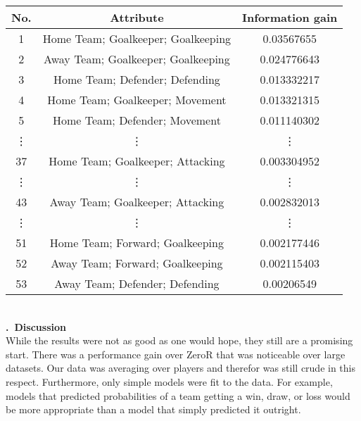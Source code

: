 \documentclass[a4paper,11pt,table]{article}
\renewcommand{\section}[1]{\stepcounter{section}\noindent\textbf{\arabic{section}.~#1}\\}
\begin{document}
\begin{center}
    \begin{tabular}{|c|c|c|}
        \hline
        No. &   Attribute                           &   Information gain \\
        \hline
        1   &   Home Team; Goalkeeper; Goalkeeping  &   0.03567655 \\
        \hline
        2   &   Away Team; Goalkeeper; Goalkeeping  &   0.024776643 \\
        \hline
        3   &   Home Team; Defender; Defending      &   0.013332217 \\
        \hline
        4   &   Home Team; Goalkeeper; Movement     &   0.013321315 \\
        \hline
        5   &   Home Team; Defender; Movement       &   0.011140302 \\
        \hline
        \vdots  &   \vdots  &   \vdots \\
        \hline
        37  &   Home Team; Goalkeeper; Attacking    &   0.003304952 \\
        \hline
        \vdots  &   \vdots  &   \vdots \\
        \hline
        43  &   Away Team; Goalkeeper; Attacking    &   0.002832013 \\
        \hline
        \vdots  &   \vdots  &   \vdots \\
        \hline
        51  &   Home Team; Forward; Goalkeeping     &   0.002177446 \\
        \hline
        52  &   Away Team; Forward; Goalkeeping     &   0.002115403 \\
        \hline
        53  &   Away Team; Defender; Defending      &   0.00206549 \\
        \hline
    \end{tabular}
\end{center}
~\\
\section{Discussion}
While the results were not as good as one would hope, they still are a promising start. There was a performance gain over ZeroR that was noticeable over large datasets. Our data was averaging over players and therefor was still crude in this respect. Furthermore, only simple models were fit to the data. For example, models that predicted probabilities of a team getting a win, draw, or loss would be more appropriate than a model that simply predicted it outright.
\end{document}
